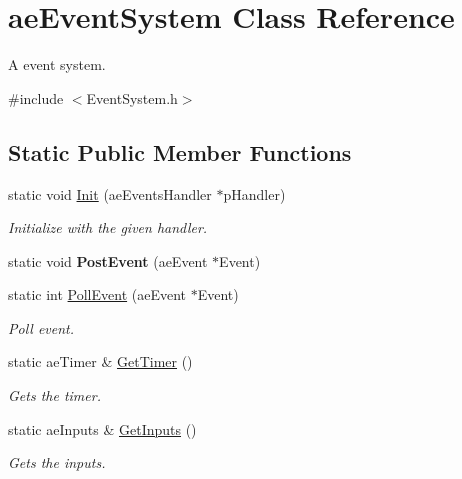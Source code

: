 \hypertarget{classae_event_system}{}\section{ae\+Event\+System Class Reference}
\label{classae_event_system}


A event system.  




{\ttfamily \#include $<$Event\+System.\+h$>$}

\subsection*{Static Public Member Functions}
\begin{DoxyCompactItemize}
\item 
static void \hyperlink{classae_event_system_ac7ee69d78817f709535299b0b5ba3305}{Init} (ae\+Events\+Handler $\ast$p\+Handler)
\begin{DoxyCompactList}\small\item\em Initialize with the given handler. \end{DoxyCompactList}\item 
static void {\bfseries Post\+Event} (ae\+Event $\ast$Event)\hypertarget{classae_event_system_a62ebd04bd3d6ed425cc4534fc48d27f9}{}\label{classae_event_system_a62ebd04bd3d6ed425cc4534fc48d27f9}

\item 
static int \hyperlink{classae_event_system_a46a6cdda7ea12599904e9e741bd534bc}{Poll\+Event} (ae\+Event $\ast$Event)
\begin{DoxyCompactList}\small\item\em Poll event. \end{DoxyCompactList}\item 
static ae\+Timer \& \hyperlink{classae_event_system_afd185e86cbef031867b4be5291812624}{Get\+Timer} ()
\begin{DoxyCompactList}\small\item\em Gets the timer. \end{DoxyCompactList}\item 
static ae\+Inputs \& \hyperlink{classae_event_system_ae05709e3c02317e800749c71d7cb3537}{Get\+Inputs} ()
\begin{DoxyCompactList}\small\item\em Gets the inputs. \end{DoxyCompactList}\end{DoxyCompactItemize}


